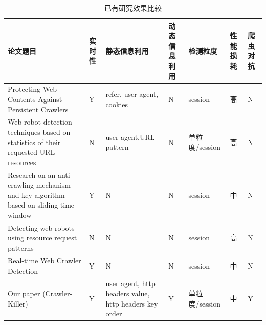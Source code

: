 \documentclass[doctor,privacy,twoside]{buaa_mac}
\begin{document}
\centerline{}
\begin{table}[h]
  \caption{已有研究效果比较}
  \label{tab:anti-crawler-now}
  \centering
\begin{tabular}{|p{4cm}<{\centering}|p{1cm}<{\centering}|p{3cm}<{\centering}|p{1cm}<{\centering}|p{1.5cm}<{\centering}|p{1cm}<{\centering}|p{1cm}<{\centering}|}
    \hline
    论文题目                                                                                  & 实时性 & 静态信息利用                                                 & 动态信息利用 & 检测粒度        & 性能损耗 & 爬虫对抗 \\
    \hline
    Protecting Web Contents Against Persistent Crawlers                                   & Y   & refer, user agent, cookies                             & N      & session     & 高    & N    \\ 
    \hline
    Web robot detection techniques based on statistics of their requested URL resources   & N   & user agent,URL pattern                                 & N      & 单粒度/session & 高    & N    \\
    \hline
    Research on an anti-crawling mechanism and key algorithm based on sliding time window & Y   & N                                                      & N      & session     & 中    & N    \\ 
    \hline
    Detecting web robots using resource request patterns                                  & N   & N                                                      & N      & session     & 高    & N    \\
    \hline
    Real-time Web Crawler Detection                                                       & Y   & N                                                      & N      & session     & 中    & N    \\
    \hline
    Our paper (Crawler-Killer)                                                               & Y   & user agent, http headers value, http headers key order & Y      & 单粒度/session & 中    & Y    \\
    \hline
    \end{tabular}
\end{table}
\end{document}
